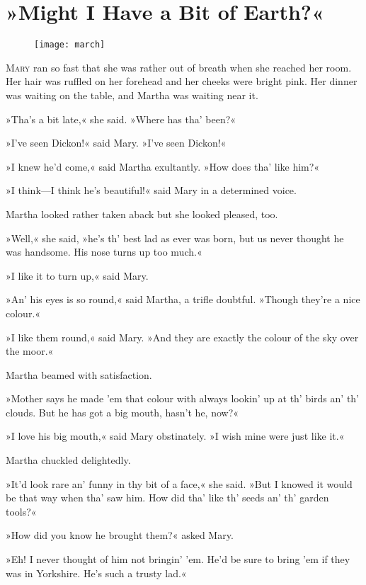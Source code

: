 \chapter{»Might I Have a Bit of Earth?«} 
	
\begin{figure}[t!]
\centering
\texttt{[image: march]}
\end{figure}

 \lettrine[lines=6]{M}{ary} ran so fast that she was rather out of breath when she reached her room. Her hair was ruffled on her forehead and her cheeks were bright pink. Her dinner was waiting on the table, and Martha was waiting near it.

\zz
»Tha's a bit late,« she said. »Where has tha' been?«

\zz
»I've seen Dickon!« said Mary. »I've seen Dickon!«

»I knew he'd come,« said Martha exultantly. »How does tha' like him?«

»I think—I think he's beautiful!« said Mary in a determined voice.

Martha looked rather taken aback but she looked pleased, too.

»Well,« she said, »he's th' best lad as ever was born, but us never thought he was handsome. His nose turns up too much.«

»I like it to turn up,« said Mary.

»An' his eyes is so round,« said Martha, a trifle doubtful. »Though they're a nice colour.«

»I like them round,« said Mary. »And they are exactly the colour of the sky over the moor.«

Martha beamed with satisfaction.

»Mother says he made 'em that colour with always lookin' up at th' birds an' th' clouds. But he has got a big mouth, hasn't he, now?«

»I love his big mouth,« said Mary obstinately. »I wish mine were just like it.«

Martha chuckled delightedly.

»It'd look rare an' funny in thy bit of a face,« she said. »But I knowed it would be that way when tha' saw him. How did tha' like th' seeds an' th' garden tools?«

»How did you know he brought them?« asked Mary.

»Eh! I never thought of him not bringin' 'em. He'd be sure to bring 'em if they was in Yorkshire. He's such a trusty lad.«

